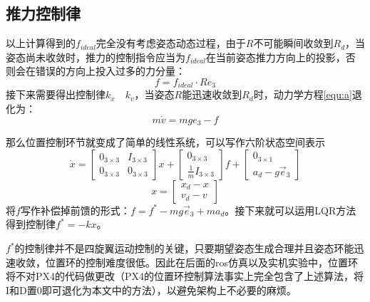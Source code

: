       \subsection{推力控制律}
      以上计算得到的$f_{ideal}$完全没有考虑姿态动态过程，由于$R$不可能瞬间收敛到$R_d$，当姿态尚未收敛时，推力的控制指令应当为$f_{ideal}$在当前姿态推力方向上的投影，否则会在错误的方向上投入过多的力分量：
      $$f=f_{ideal}\cdot R e_3$$
      接下来需要得出控制律$k_x \quad k_v$，当姿态$R$能迅速收敛到$R_d$时，动力学方程\ref{equ:a}退化为：
      $$m \dot v=mge_3-f$$

      那么位置控制环节就变成了简单的线性系统，可以写作六阶状态空间表示
      $$\dot x=\begin{bmatrix}
        0_{3\times 3} & I_{3\times 3} \\
        0_{3\times 3} & 0_{3\times 3}
    \end{bmatrix} x+\begin{bmatrix}
        0_{3\times 3} \\ \frac{1}{m} I_{3\times 3}
    \end{bmatrix} f +\begin{bmatrix}
        0_{3 \times 1} \\ a_d-g \vec e_3 
    \end{bmatrix}$$
    $$x=\begin{bmatrix}
        x_d -x \\ v_d -v
    \end{bmatrix}$$
      将$f$写作补偿掉前馈的形式：$f=f^*-mg \vec e_3 +m a_d$。接下来就可以运用LQR方法得到控制律$f^*=-kx$。

    $f^*$的控制律并不是四旋翼运动控制的关键，只要期望姿态生成合理并且姿态环能迅速收敛，位置环的控制难度很低。因此在后面的ros仿真以及实机实验中，位置环将不对PX4的代码做更改（PX4的位置环控制算法事实上完全包含了上述算法，将I和D置0即可退化为本文中的方法），以避免架构上不必要的麻烦。

